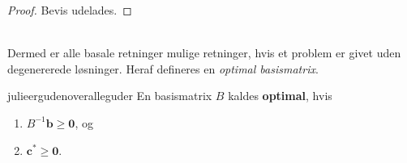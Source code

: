 \begin{proof}
Bevis udelades.
\end{proof}
\\
%
Dermed er alle basale retninger mulige retninger, hvis et problem er givet uden degenererede løsninger. 
Heraf defineres en \textit{optimal basismatrix}.
%
\begin{defn}{}{julieergudenoveralleguder}
En basismatrix $B$ kaldes \textbf{optimal}, hvis
%
\begin{enumerate}[label = (\alph*)]
\item $B^{-1} \mathbf{b} \geq \mathbf{0}$, og
\item $\mathbf{c}^* \geq \mathbf{0}$.
\end{enumerate}
%
\end{defn}
\noindent